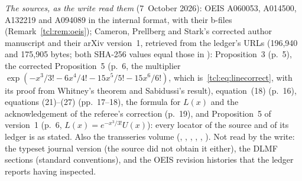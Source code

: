 \begin{writenote}
\emph{The sources, as the write read them} (7~October 2026): OEIS A060053,
A014500, A132219 and A094089 in the internal format, with their b-files
(Remark~\ref{tcl:rem:oeis}); Cameron, Prellberg and Stark's corrected author
manuscript  and their arXiv version~1, retrieved from the
ledger's URLs (196{,}940 and 175{,}905 bytes; both SHA-256 values equal those
in ): Proposition~3 (p.~5), the corrected
Proposition~5 (p.~6, the multiplier
$\exp(-x^3/3!-6x^4/4!-15x^5/5!-15x^6/6!)$, which is~\eqref{tcl:eq:linecorrect},
with its proof from Whitney's theorem and Sabidussi's result), equation~(18)
(p.~16), equations (21)--(27) (pp.~17--18), the formula for $L(x)$ and the
acknowledgement of the referee's correction (p.~19), and Proposition~5 of
version~1 (p.~6, $L(x)=e^{-x^3/3!}U(x)$): every locator of the source and of
its ledger is as stated. Also the transseries volume
(, , ,
, ,
). Not read by the write: the typeset journal
version (the source did not obtain it either), the DLMF sections (standard
conventions), and the OEIS revision histories that the ledger reports having
inspected.


\end{writenote}
